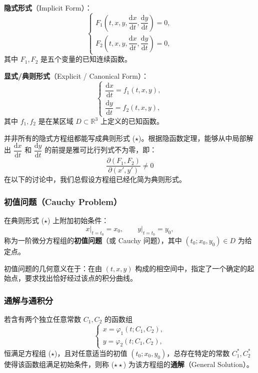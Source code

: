 \documentclass[lang=cn,11pt]{elegantbook}
\begin{document}
\begin{definition}[一阶微分方程组的一般形式] \label{def:first-order-system-general}
\textbf{隐式形式}（Implicit Form）：
\[
\begin{cases}
F_1\!\left(t,x,y,\dfrac{\mathrm{d}x}{\mathrm{d}t},\dfrac{\mathrm{d}y}{\mathrm{d}t}\right)=0,\\[6pt]
F_2\!\left(t,x,y,\dfrac{\mathrm{d}x}{\mathrm{d}t},\dfrac{\mathrm{d}y}{\mathrm{d}t}\right)=0,
\end{cases}
\]
其中 $F_1,F_2$ 是五个变量的已知连续函数。

\textbf{显式/典则形式}（Explicit / Canonical Form）：
\[
\begin{cases}
\dfrac{\mathrm{d}x}{\mathrm{d}t}=f_1(t,x,y),\\[6pt]
\dfrac{\mathrm{d}y}{\mathrm{d}t}=f_2(t,x,y),
\end{cases}
\tag{$\star$}
\]
其中 $f_1,f_2$ 是在某区域 $D\subset\mathbb R^3$ 上定义的已知函数。
\end{definition}

\begin{note}[从隐式到显式]
并非所有的隐式方程组都能写成典则形式 ($\star$)。根据隐函数定理，能够从中局部解出 $\dfrac{\mathrm{d}x}{\mathrm{d}t}$ 和 $\dfrac{\mathrm{d}y}{\mathrm{d}t}$ 的前提是雅可比行列式不为零，即：
\[
\frac{\partial(F_1,F_2)}{\partial(x',y')} \neq 0
\]
在以下的讨论中，我们总假设方程组已经化简为典则形式。
\end{note}


\subsubsection*{初值问题（Cauchy Problem）}

\begin{definition}[一阶方程组的初值问题] \label{def:ivp-sys}
在典则形式 ($\star$) 上附加初始条件：
\[
x\big|_{t=t_0}=x_0,\qquad y\big|_{t=t_0}=y_0,
\]
称为一阶微分方程组的\textbf{初值问题}（或 Cauchy 问题），其中 $(t_0;x_0,y_0)\in D$ 为给定点。
\end{definition}

初值问题的几何意义在于：在由 $(t,x,y)$ 构成的相空间中，指定了一个确定的起始点，要求找出恰好经过该点的积分曲线。


\subsubsection*{通解与通积分}

\begin{definition}[一阶方程组的通解] \label{def:general-solution-sys}
若含有两个独立任意常数 $C_1,C_2$ 的函数组
\[
\begin{cases}
x=\varphi_1(t;C_1,C_2),\\
y=\varphi_2(t;C_1,C_2),
\end{cases}
\tag{$\star\star$}
\]
恒满足方程组 ($\star$)，且对任意适当的初值 $(t_0;x_0,y_0)$，总存在特定的常数 $C_1^*,C_2^*$ 使得该函数组满足初始条件，则称 ($\star\star$) 为该方程组的\textbf{通解}（General Solution）。
\end{definition}
\end{document}
